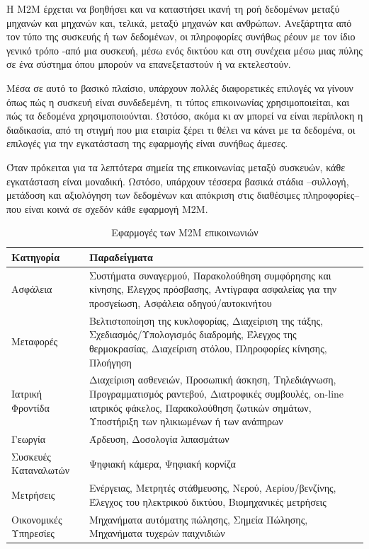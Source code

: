 \documentclass[12pt, a4paper, oneside]{report}
\begin{document}
Η Μ2Μ έρχεται να βοηθήσει και να καταστήσει ικανή τη ροή δεδομένων μεταξύ μηχανών και μηχανών και, τελικά, μεταξύ μηχανών και ανθρώπων. Ανεξάρτητα από τον τύπο της συσκευής ή των δεδομένων, οι πληροφορίες συνήθως ρέουν με τον ίδιο γενικό τρόπο -από μια συσκευή, μέσω ενός δικτύου και στη συνέχεια μέσω μιας πύλης σε ένα σύστημα όπου μπορούν να επανεξεταστούν ή να εκτελεστούν.

Μέσα σε αυτό το βασικό πλαίσιο, υπάρχουν πολλές διαφορετικές επιλογές να γίνουν όπως πώς η συσκευή είναι συνδεδεμένη, τι τύπος επικοινωνίας χρησιμοποιείται, και πώς τα δεδομένα χρησιμοποιούνται. Ωστόσο, ακόμα κι αν μπορεί να είναι περίπλοκη η διαδικασία, από τη στιγμή που μια εταιρία ξέρει τι θέλει να κάνει με τα δεδομένα, οι επιλογές για την εγκατάσταση της εφαρμογής είναι συνήθως άμεσες.\newpage

Όταν πρόκειται για τα λεπτότερα σημεία της επικοινωνίας μεταξύ συσκευών, κάθε εγκατάσταση είναι μοναδική. Ωστόσο, υπάρχουν τέσσερα βασικά στάδια –συλλογή, μετάδοση και αξιολόγηση των δεδομένων και απόκριση στις διαθέσιμες πληροφορίες– που είναι κοινά σε σχεδόν κάθε εφαρμογή Μ2Μ.

\bigskip
\begin{table}[hbp]
\centering
{\renewcommand{\arraystretch}{1.5}
\renewcommand{\tabcolsep}{0.2cm}
\footnotesize
\begin{tabular}{|C{0.3\textwidth}|C{0.7\textwidth}|}
\hline
Κατηγορία & Παραδείγματα\\ \hline
Ασφάλεια & Συστήματα συναγερμού, Παρακολούθηση συμφόρησης και κίνησης, Έλεγχος πρόσβασης, Αντίγραφα ασφαλείας για την προσγείωση, Ασφάλεια οδηγού\slash αυτοκινήτου\\ \hline
Μεταφορές & Βελτιστοποίηση της κυκλοφορίας, Διαχείριση της τάξης, Σχεδιασμός/Υπολογισμός διαδρομής, Έλεγχος της θερμοκρασίας, Διαχείριση στόλου, Πληροφορίες κίνησης, Πλοήγηση\\ \hline
Ιατρική Φροντίδα & Διαχείριση ασθενειών, Προσωπική άσκηση, Τηλεδιάγνωση, Προγραμματισμός ραντεβού, Διατροφικές συμβουλές, on-line ιατρικός φάκελος, Παρακολούθηση ζωτικών σημάτων, Υποστήριξη των ηλικιωμένων ή των ανάπηρων\\ \hline
Γεωργία & Άρδευση, Δοσολογία λιπασμάτων\\ \hline
Συσκευές Καταναλωτών & Ψηφιακή κάμερα, Ψηφιακή κορνίζα\\ \hline
Μετρήσεις & Ενέργειας, Μετρητές στάθμευσης, Νερού, Αερίου\slash βενζίνης, Έλεγχος του ηλεκτρικού δικτύου, Βιομηχανικές μετρήσεις\\ \hline
Οικονομικές Υπηρεσίες & Μηχανήματα αυτόματης πώλησης, Σημεία Πώλησης, Μηχανήματα τυχερών παιχνιδιών\\
\hline
\end{tabular}
}
\caption{Εφαρμογές των M2M επικοινωνιών}
\end{table}
\end{document}
